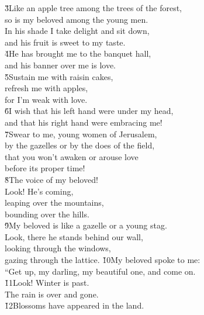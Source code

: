 \begin{poetry}
\poeml \v{3}Like an apple tree among the trees of the forest, \\
\poemll    so is my beloved among the young men. \\
\poeml In his shade I take delight and sit down, \\
\poemll    and his fruit is sweet to my taste. \\
\poeml \v{4}He has brought me to the banquet hall, \\
\poemll    and his banner over me is love. \\
\poeml \v{5}Sustain me with raisin cakes, \\
\poemll    refresh me with apples, \\
\poemlll       for I'm weak with love. \\
\poeml \v{6}I wish that his left hand were under my head, \\
\poemll    and that his right hand were embracing me! \\
\poeml \v{7}Swear to me, young women of Jerusalem, \\
\poemll    by the gazelles or by the does of the field, \\
\poeml that you won't awaken or arouse love \\
\poemll    before its proper time! \\
\poeml \v{8}The voice of my beloved! \\
\poeml Look! He's coming, \\
\poemll    leaping over the mountains, \\
\poemlll       bounding over the hills. \\
\poeml \v{9}My beloved is like a gazelle or a young stag. \\
\poeml Look, there he stands behind our wall, \\
\poemll    looking through the windows, \\
\poemlll       gazing through the lattice.
\poeml \v{10}My beloved spoke to me: \\
\poemll    ``Get up, my darling, my beautiful one, and come on. \\
\poeml \v{11}Look! Winter is past. \\
\poemll    The rain is over and gone. \\
\poeml \v{12}Blossoms have appeared in the land. \\

\end{poetry}
